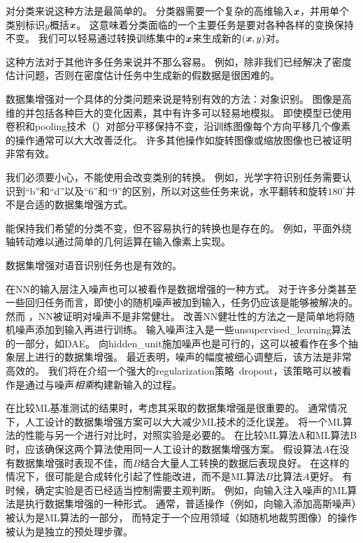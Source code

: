 对分类来说这种方法是最简单的。
分类器需要一个复杂的高维输入$\boldsymbol{\mathit{x}}$，并用单个类别标识$y$概括$\boldsymbol{\mathit{x}}$。
这意味着分类面临的一个主要任务是要对各种各样的变换保持不变。
我们可以轻易通过转换训练集中的$\boldsymbol{\mathit{x}}$来生成新的$(\boldsymbol{\mathit{x}}, y)$对。

这种方法对于其他许多任务来说并不那么容易。
例如，除非我们已经解决了密度估计问题，否则在密度估计任务中生成新的假数据是很困难的。

数据集增强对一个具体的分类问题来说是特别有效的方法：对象识别。
图像是高维的并包括各种巨大的变化因素，其中有许多可以轻易地模拟。
即使模型已使用卷积和\gls{pooling}技术（）对部分平移保持不变，沿训练图像每个方向平移几个像素的操作通常可以大大改善泛化。
许多其他操作如旋转图像或缩放图像也已被证明非常有效。

我们必须要小心，不能使用会改变类别的转换。
例如，光学字符识别任务需要认识到``b''和``d''以及``6''和``9''的区别，所以对这些任务来说，水平翻转和旋转$180^{\circ}$并不是合适的数据集增强方式。


能保持我们希望的分类不变，但不容易执行的转换也是存在的。
例如，平面外绕轴转动难以通过简单的几何运算在输入像素上实现。

数据集增强对语音识别任务也是有效的\citep{Jaitly_VTLP_2013}。

在\gls{NN}的输入层注入噪声\citep{SietsmaDow91}也可以被看作是数据增强的一种方式。
对于许多分类甚至一些回归任务而言，即使小的随机噪声被加到输入，任务仍应该是能够被解决的。
然而 ，\gls{NN}被证明对噪声不是非常健壮\citep{TangElias10}。
改善\gls{NN}健壮性的方法之一是简单地将随机噪声添加到输入再进行训练。
输入噪声注入是一些\gls{unsupervised_learning}算法的一部分，如\gls{DAE}\citep{VincentPLarochelleH2008}。
向\gls{hidden_unit}施加噪声也是可行的，这可以被看作在多个抽象层上进行的数据集增强。
\cite{Poole14}最近表明，噪声的幅度被细心调整后，该方法是非常高效的。
我们将在介绍一个强大的\gls{regularization}策略~\gls{dropout}，该策略可以被看作是通过与噪声\emph{相乘}构建新输入的过程。

在比较\gls{ML}基准测试的结果时，考虑其采取的数据集增强是很重要的。
通常情况下，人工设计的数据集增强方案可以大大减少\gls{ML}技术的泛化误差。
将一个\gls{ML}算法的性能与另一个进行对比时，对照实验是必要的。
在比较\gls{ML}算法A和\gls{ML}算法B时，应该确保这两个算法使用同一人工设计的数据集增强方案。
假设算法$A$在没有数据集增强时表现不佳，而$B$结合大量人工转换的数据后表现良好。
在这样的情况下，很可能是合成转化引起了性能改进，而不是\gls{ML}算法$B$比算法$A$更好。 
有时候，确定实验是否已经适当控制需要主观判断。
例如，向输入注入噪声的\gls{ML}算法是执行数据集增强的一种形式。
通常，普适操作（例如，向输入添加高斯噪声）被认为是\gls{ML}算法的一部分，
而特定于一个应用领域（如随机地裁剪图像）的操作被认为是独立的预处理步骤。

